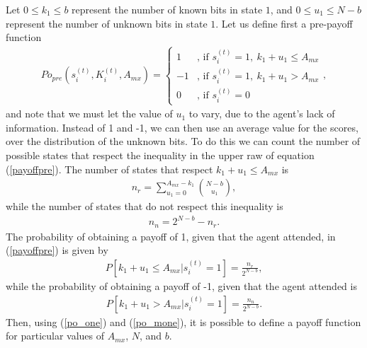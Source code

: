 \documentclass[12pt]{article}
\begin{document}
Let $0\leq k_1\leq b$ represent the number of known bits in state $1$, and $0\leq u_1\leq N-b$ represent the number of unknown bits in state $1$. Let us define first a pre-payoff function 
\begin{align}
  Po_{pre}(s_i^{(t)},K_i^{(t)},A_{mx})=\left\{\begin{array}{ll}
  1&\text{, if }s_i^{(t)}=1,\ k_1+u_1\leq A_{mx}\\
  -1&\text{, if }s_i^{(t)}=1,\ k_1+u_1> A_{mx}\\
  0&\text{, if }s_i^{(t)}=0
  \end{array}\right. ,
  \label{payoffpre}
\end{align}
and note that we must let the value of $u_1$ to vary, due to the agent's lack of information. Instead of 1 and -1, we can then use an average value for the scores, over the distribution of the unknown bits. To do this we can count the number of possible states that respect the inequality in the upper raw of equation (\ref{payoffpre}). The number of states that respect $k_1+u_1\leq A_{mx}$ is
\begin{align}
  n_r=\sum_{u_1=0}^{A_{mx}-k_1}\binom{N-b}{u_1},
  \label{resp}
\end{align}
while the number of states that do not respect this inequality is
\begin{align}
  n_n=2^{N-b}-n_r.
  \label{noresp}
\end{align}
The probability of obtaining a payoff of 1, given that the agent attended, in (\ref{payoffpre}) is given by
\begin{align}
  P[k_1+u_1\leq A_{mx}|s_i^{(t)}=1]=\frac{n_r}{2^{N-b}},
  \label{po_one}
\end{align}
while the probability of obtaining a payoff of -1, given that the agent attended is
\begin{align}
  P[k_1+u_1> A_{mx}|s_i^{(t)}=1]=\frac{n_n}{2^{N-b}}.
  \label{po_mone}
\end{align}
Then, using (\ref{po_one}) and (\ref{po_mone}), it is possible to define a payoff function for particular values of $A_{mx}$, $N$, and $b$.\\
\end{document}
